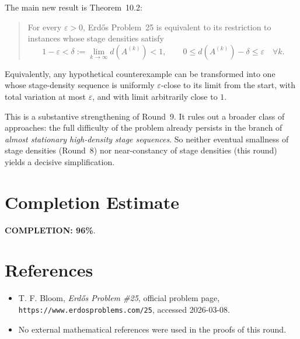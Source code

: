 The main new result is Theorem~10.2:
\begin{quote}
For every $\varepsilon>0$, Erd\H{o}s Problem~25 is equivalent to its restriction to instances whose stage densities satisfy
\[
1-\varepsilon<\delta:=\lim_{k\to\infty}d(A^{(k)})<1,
\qquad
0\le d(A^{(k)})-\delta\le \varepsilon\quad \forall k.
\]
\end{quote}
Equivalently, any hypothetical counterexample can be transformed into one whose stage-density sequence is uniformly $\varepsilon$-close to its limit from the start, with total variation at most $\varepsilon$, and with limit arbitrarily close to $1$.

This is a substantive strengthening of Round~9.  It rules out a broader class of approaches: the full difficulty of the problem already persists in the branch of \emph{almost stationary high-density stage sequences}.  So neither eventual smallness of stage densities (Round~8) nor near-constancy of stage densities (this round) yields a decisive simplification.

\section{Completion Estimate}
\textbf{COMPLETION: 96\%}.

\section{References}
\begin{itemize}
\item T. F. Bloom, \emph{Erd\H{o}s Problem \#25}, official problem page, \texttt{https://www.erdosproblems.com/25}, accessed 2026-03-08.
\item No external mathematical references were used in the proofs of this round.
\end{itemize}
